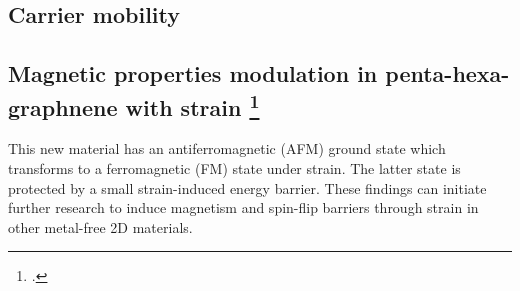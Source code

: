 %

\subsection{Carrier mobility}

\subsection[Magnetic properties modulation in penta-hexa-graphnene with strain]{Magnetic properties modulation in penta-hexa-graphnene with strain \footcite[This work is published in:][]{Aierken2016.magnetism}}

This new material has an antiferromagnetic (AFM) ground state which transforms to a ferromagnetic (FM) state under strain. The latter state is protected by a small strain-induced energy barrier. These findings can initiate further research to induce magnetism and spin-flip barriers through strain in other metal-free 2D materials.

